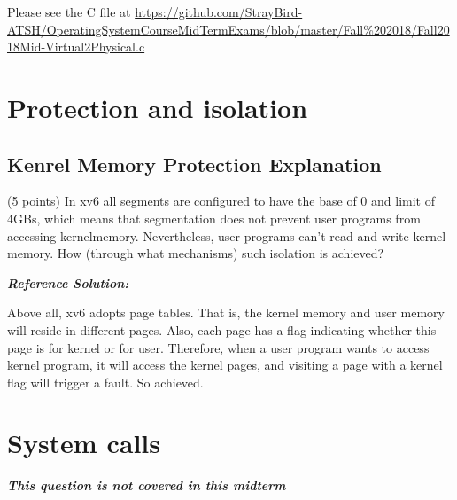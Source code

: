 \documentclass[]{article}
\begin{document}
Please see the C file at
\url{https://github.com/StrayBird-ATSH/OperatingSystemCourseMidTermExams/blob/master/Fall\%202018/Fall2018Mid-Virtual2Physical.c}

\hypertarget{protection-and-isolation}{%
\section{Protection and isolation}\label{protection-and-isolation}}

\hypertarget{kenrel-memory-protection-explanation}{%
\subsection{Kenrel Memory Protection
Explanation}\label{kenrel-memory-protection-explanation}}

(5 points) In xv6 all segments are configured to have the base of 0 and
limit of 4GBs, which means that segmentation does not prevent user
programs from accessing kernelmemory. Nevertheless, user programs can't
read and write kernel memory. How (through what mechanisms) such
isolation is achieved?

\textbf{\emph{Reference Solution:}}

Above all, xv6 adopts page tables. That is, the kernel memory and user
memory will reside in different pages. Also, each page has a flag
indicating whether this page is for kernel or for user. Therefore, when
a user program wants to access kernel program, it will access the kernel
pages, and visiting a page with a kernel flag will trigger a fault. So
achieved.

\hypertarget{system-calls}{%
\section{System calls}\label{system-calls}}

\textbf{\emph{This question is not covered in this midterm}}
\end{document}
